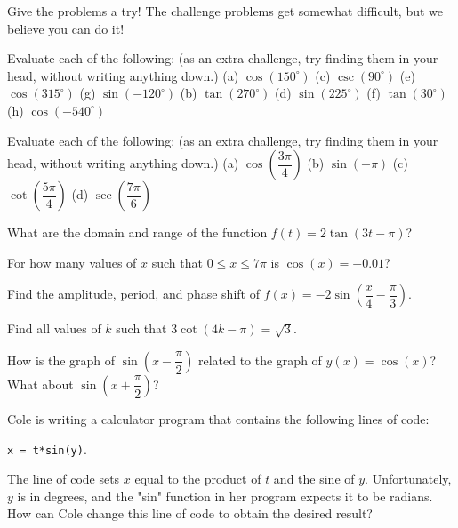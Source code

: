 \documentclass[lang=en,11pt]{elegantbook}
\begin{document}
Give the problems a try! The challenge problems get somewhat difficult, but we believe you can do it!
\begin{reviewset}
\item Evaluate each of the following: (as an extra challenge, try finding them in your head, without writing anything down.) \newline
(a) $\cos(150^{\circ})$  (c) $\csc(90^{\circ})$  (e) $\cos(315^{\circ})$  (g) $\sin(-120^{\circ})$ \newline
(b) $\tan(270^{\circ})$  (d) $\sin(225^{\circ})$  (f) $\tan(30^{\circ})$  (h) $\cos(-540^{\circ})$ \vspace{3mm}
\item Evaluate each of the following: (as an extra challenge, try finding them in your head, without writing anything down.) \newline
(a) $\cos\left(\dfrac{3\pi}{4}\right)$  (b) $\sin\left(-\pi\right)$  (c) $\cot\left(\dfrac{5\pi}{4}\right)$  (d) $\sec\left(\dfrac{7\pi}{6}\right)$ \vspace{3mm}
\item What are the domain and range of the function $f(t)=2\tan(3t-\pi)$? \vspace{3mm}
\item For how many values of $x$ such that $0\leq x\leq 7\pi$ is $\cos(x)=-0.01$? \vspace{3mm}
\item Find the amplitude, period, and phase shift of $f(x)=-2\sin\left(\dfrac{x}{4}-\dfrac{\pi}{3}\right)$. \vspace{3mm}
\item Find all values of $k$ such that $3\cot(4k-\pi)=\sqrt{3}$. \vspace{3mm}
\item How is the graph of $\sin\left(x-\dfrac{\pi}{2}\right)$ related to the graph of $y(x)=\cos(x)$? What about $\sin\left(x+\dfrac{\pi}{2}\right)$? \vspace{3mm}
\item Cole is writing a calculator program that contains the following lines of code: \begin{center}\texttt{x = t*sin(y)}.\end{center}  The line of code sets $x$ equal to the product of $t$ and the sine of $y$.  Unfortunately, $y$ is in degrees, and the "sin" function in her program expects it to be radians.  How can Cole change this line of code to obtain the desired result? \vspace{3mm}

\end{reviewset}
\end{document}
